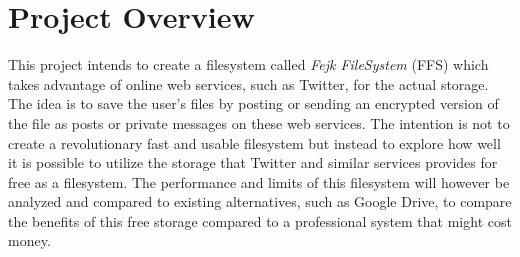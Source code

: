 \section{Project Overview}

This project intends to create a filesystem called \textit{Fejk FileSystem} (FFS) which takes advantage of online web services, such as Twitter, for the actual storage. The idea is to save the user's files by posting or sending an encrypted version of the file as posts or private messages on these web services. The intention is not to create a revolutionary fast and usable filesystem but instead to explore how well it is possible to utilize the storage that Twitter and similar services provides for free as a filesystem. The performance and limits of this filesystem will however be analyzed and compared to existing alternatives, such as Google Drive, to compare the benefits of this free storage compared to a professional system that might cost money.